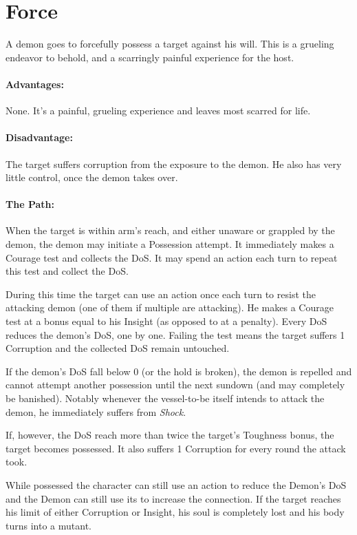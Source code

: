 \section{Force}
\label{possession:force}
A demon goes to forcefully possess a target against his will.
This is a grueling endeavor to behold,
and a scarringly painful experience for the host.
\paragraph{Advantages:}
None.
It's a painful, grueling experience and leaves most scarred for life.
\paragraph{Disadvantage:}
The target suffers corruption from the exposure to the demon.
He also has very little control, once the demon takes over.
\paragraph{The Path:}
When the target is within arm's reach, and either unaware or grappled by the demon, the demon may initiate a Possession attempt.
It immediately makes a Courage test and collects the DoS.
It may spend an action each turn to repeat this test and collect the DoS.
\par \vspace{-5mm}
During this time the target can use an action once each turn to resist the attacking demon
	(one of them if multiple are attacking).
He makes a Courage test at a bonus equal to his Insight (as opposed to at a penalty).
Every DoS reduces the demon's DoS, one by one.
Failing the test means the target suffers 1 Corruption and the collected DoS remain untouched.
\par \vspace{-5mm}
If the demon's DoS fall below 0 (or the hold is broken), the demon is repelled and cannot attempt another possession until the next sundown (and may completely be banished).
Notably whenever the vessel-to-be itself intends to attack the demon, he immediately suffers from \emph{Shock}.
\par \vspace{-5mm}
If, however, the DoS reach more than twice the target's Toughness bonus, the target becomes possessed.
It also suffers 1 Corruption for every round the attack took.
\par \vspace{-5mm}
While possessed the character can still use an action to reduce the Demon's DoS and the Demon can still use its to increase the connection.
If the target reaches his limit of either Corruption or Insight, his soul is completely lost and his body turns into a mutant.
